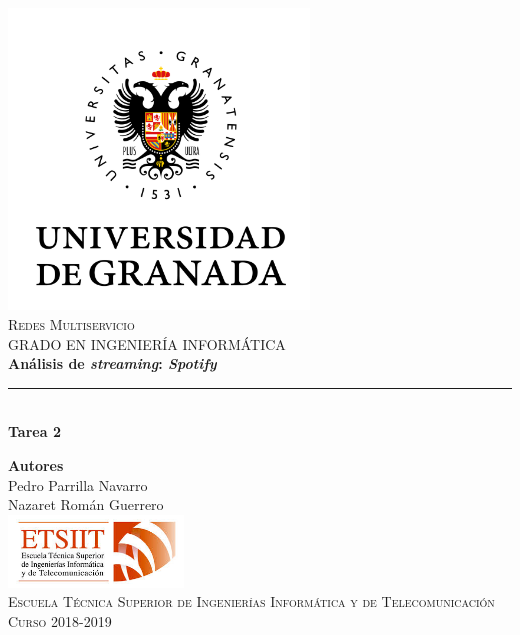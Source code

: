 \documentclass[11pt,a4paper]{article}
\begin{document}
\begin{titlepage}

\begin{minipage}{\textwidth}

\centering
\includegraphics[width=0.6\textwidth]{img/logo.png}\\

\textsc{\Large Redes Multiservicio\\[0.2cm]}
\textsc{GRADO EN INGENIERÍA INFORMÁTICA}\\[1cm]

{\Huge\bfseries Análisis de \textit{streaming}: \textit{Spotify}\\}
\noindent\rule[-1ex]{\textwidth}{3pt}\\[3.5ex]
{\large\bfseries Tarea 2}
\end{minipage}

\vspace{1cm}
\begin{minipage}{\textwidth}
\centering

\textbf{Autores}\\ {Pedro Parrilla Navarro\\Nazaret Román Guerrero}\\[2.5ex]
\includegraphics[width=0.35\textwidth]{img/etsiit.jpeg}\\[0.1cm]
\vspace{0.5cm}
\textsc{Escuela Técnica Superior de Ingenierías Informática y de Telecomunicación}\\
\vspace{0.5cm}
\textsc{Curso 2018-2019}
\end{minipage}
\end{titlepage}
\end{document}
